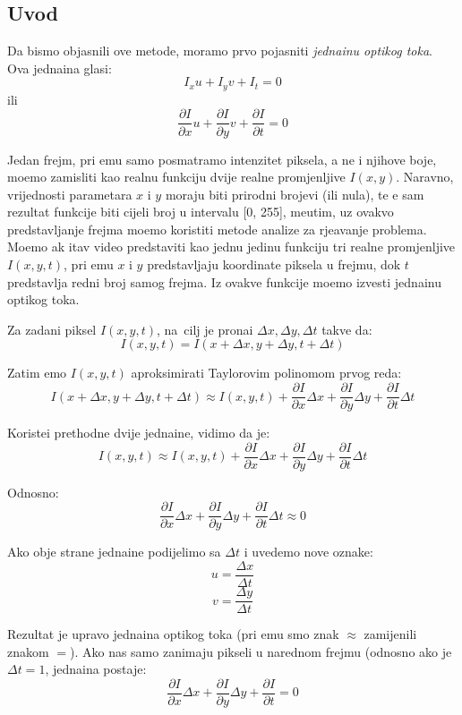 \subsection{Uvod}
Da bismo objasnili ove metode, moramo prvo pojasniti \textit{jedna\ch inu opti\ch kog toka}. Ova jedna\ch ina glasi\cite{wikioptflow, matlablk}:
\[
I_xu+I_yv+I_t=0
\]
ili
\[
\frac{\partial I}{\partial x}u+\frac{\partial I}{\partial y}v+\frac{\partial I}{\partial t}=0
\]

Jedan frejm, pri \ch emu samo posmatramo intenzitet piksela, a ne i njihove boje, mo\zh emo zamisliti kao realnu funkciju dvije realne promjenljive $I(x,y)$. Naravno, vrijednosti parametara
$x$ i $y$ moraju biti prirodni brojevi (ili nula), te \cj e sam rezultat funkcije biti cijeli broj u intervalu [0, 255], me\dj utim, uz ovakvo predstavljanje frejma mo\zh emo koristiti metode analize za
rje\sh avanje problema. Mo\zh emo \ch ak \ch itav video predstaviti kao jednu jedinu funkciju tri realne promjenljive $I(x,y,t)$, pri \ch emu $x$ i $y$ predstavljaju koordinate piksela u frejmu,
dok $t$ predstavlja redni broj samog frejma. Iz ovakve funkcije mo\zh emo izvesti jedna\ch inu opti\ch kog toka.

Za zadani piksel $I(x,y,t)$, na\sh\ cilj je prona\cj i $\Delta x,\Delta y,\Delta t$ takve da:
\[
I(x,y,t)=I(x+\Delta x,y+\Delta y,t+\Delta t)
\]

Zatim \cj emo $I(x,y,t)$ aproksimirati Taylorovim polinomom prvog reda:
\[
I(x+\Delta x,y+\Delta y,t+\Delta t)\approx I(x,y,t)+\frac{\partial I}{\partial x}\Delta x+\frac{\partial I}{\partial y}\Delta y+\frac{\partial I}{\partial t}\Delta t
\]

Koriste\cj i prethodne dvije jedna\ch ine, vidimo da je:
\[
I(x,y,t)\approx I(x,y,t)+\frac{\partial I}{\partial x}\Delta x+\frac{\partial I}{\partial y}\Delta y+\frac{\partial I}{\partial t}\Delta t
\]

Odnosno:
\[
\frac{\partial I}{\partial x}\Delta x+\frac{\partial I}{\partial y}\Delta y+\frac{\partial I}{\partial t}\Delta t \approx 0
\]

Ako obje strane jedna\ch ine podijelimo sa $\Delta t$ i uvedemo nove oznake:
\[
u=\frac{\Delta x}{\Delta t}
\]
\[
v=\frac{\Delta y}{\Delta t}
\]

Rezultat je upravo jedna\ch ina opti\ch kog toka (pri \ch emu smo znak $\approx$ zamijenili znakom $=$). Ako nas samo zanimaju pikseli u narednom frejmu (odnosno ako je $\Delta t=1$,
jedna\ch ina postaje:
\[
\frac{\partial I}{\partial x}\Delta x+\frac{\partial I}{\partial y}\Delta y+\frac{\partial I}{\partial t}=0
\] 

